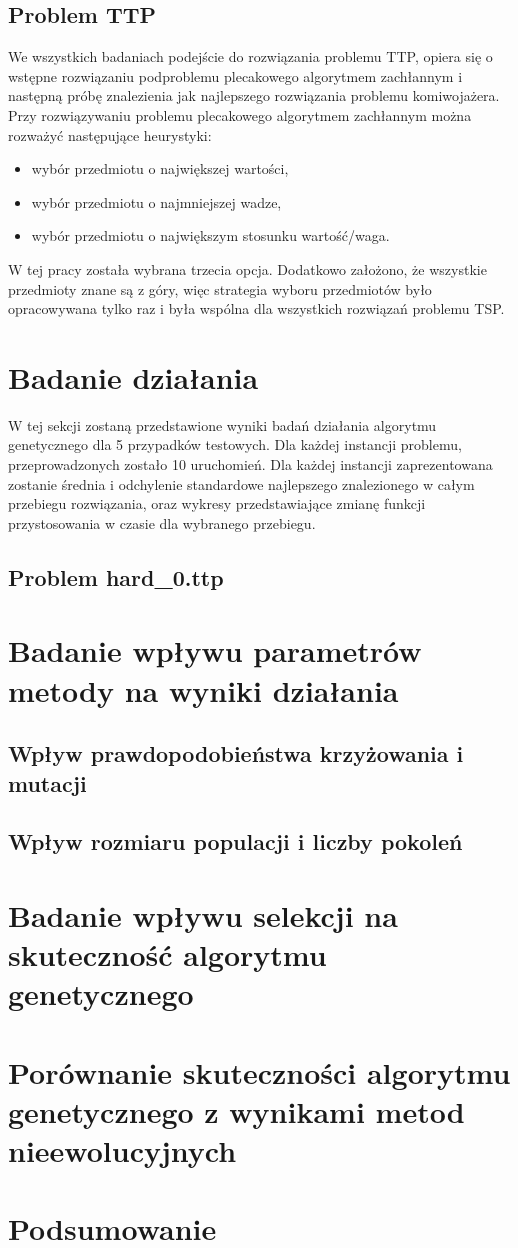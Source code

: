 \documentclass{article}
\begin{document}
	\subsection{Problem TTP}
	We wszystkich badaniach podejście do rozwiązania problemu TTP, opiera się o wstępne rozwiązaniu podproblemu plecakowego algorytmem zachłannym i następną próbę znalezienia jak najlepszego rozwiązania problemu komiwojażera.
	Przy rozwiązywaniu problemu plecakowego algorytmem zachłannym można rozważyć następujące heurystyki:
	\begin{itemize}
		\item wybór przedmiotu o największej wartości,
		\item wybór przedmiotu o najmniejszej wadze,
		\item wybór przedmiotu o największym stosunku wartość/waga.
	\end{itemize}
	W tej pracy została wybrana trzecia opcja. Dodatkowo założono, że wszystkie przedmioty znane są z góry, więc strategia wyboru przedmiotów było opracowywana tylko raz i była wspólna dla wszystkich rozwiązań problemu TSP.
	
	\section{Badanie działania}
	W tej sekcji zostaną przedstawione wyniki badań działania algorytmu genetycznego dla 5 przypadków testowych. Dla każdej instancji problemu, przeprowadzonych zostało 10 uruchomień. Dla każdej instancji zaprezentowana zostanie średnia i odchylenie standardowe najlepszego znalezionego w całym przebiegu rozwiązania, oraz wykresy przedstawiające zmianę funkcji przystosowania w czasie dla wybranego przebiegu.
	\subsection{Problem hard\_0.ttp}
	\section{Badanie wpływu parametrów metody na \mbox{wyniki} działania}
	\subsection{Wpływ prawdopodobieństwa krzyżowania i mutacji}
	\subsection{Wpływ rozmiaru populacji i liczby pokoleń}
	\section{Badanie wpływu selekcji na skuteczność \mbox{algorytmu} genetycznego}
	\section{Porównanie skuteczności algorytmu genetycznego z wynikami metod nieewolucyjnych}
	\section{Podsumowanie}
	
\end{document}
